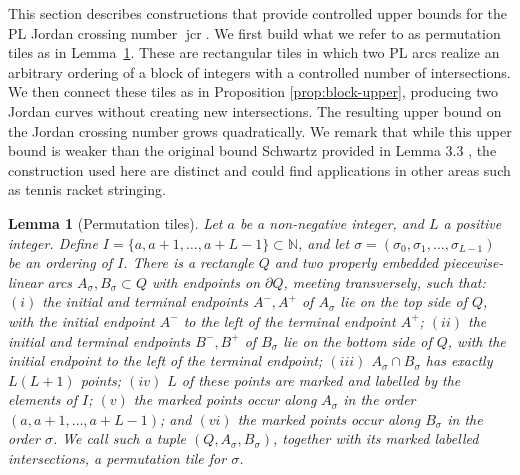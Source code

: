 \documentclass[11pt,a4paper]{amsart}
\newtheorem{lemma}[theorem]{Lemma}
\theoremstyle{definition}
\theoremstyle{remark}
\DeclareMathOperator{\jcr}{jcr}
\begin{document}
This section describes constructions that provide controlled upper bounds for the PL Jordan crossing number $\jcr$.  We first build what we refer to as permutation tiles as in Lemma~\ref{lem:tile}.  These are rectangular tiles in which two PL arcs realize an arbitrary ordering of a block of integers with a controlled number of intersections.  We then connect these tiles as in Proposition \ref{prop:block-upper}, producing two Jordan curves without creating new intersections. The resulting upper bound on the Jordan crossing number grows quadratically.  We remark that while this upper bound is weaker than the original bound Schwartz provided in Lemma 3.3 \cite{richtpss}, the construction used here are distinct and could find applications in other areas such as tennis racket stringing. 
\begin{lemma}[Permutation tiles]\label{lem:tile}
Let $a$ be a non-negative integer, and $L$ a positive integer.  Define $I=\{a,a+1,\ldots,a+L-1\}\subset\mathbb N$, and let $\sigma=(\sigma_{0},\sigma_{1},\ldots,\sigma_{L-1})$ be an ordering of $I$.  There is a rectangle $Q$ and two properly
embedded piecewise-linear arcs $A_\sigma,B_\sigma\subset Q$
with endpoints on $\partial Q$, meeting transversely, such that: $(i)$ the initial and terminal endpoints $A^-,A^+$ of $A_\sigma$ lie on the top side of
$Q$, with the initial endpoint $A^-$ to the left of the terminal endpoint $A^+$;
$(ii)$ the initial and terminal endpoints $B^-,B^+$ of $B_\sigma$ lie on the bottom side of
$Q$, with the initial endpoint to the left of the terminal endpoint;
$(iii)$ $A_\sigma\cap B_\sigma$ has exactly $L(L+1)$ points;
$(iv)$ $L$ of these points are marked and labelled by the elements of $I$;
$(v)$ the marked points occur along $A_\sigma$ in the order
$(a,a+1,\ldots,a+L-1)$; and
$(vi)$ the marked points occur along $B_\sigma$ in the order $\sigma$. We
call such a tuple $(Q,A_\sigma,B_\sigma)$, together with its marked labelled
intersections, a \emph{permutation tile} for $\sigma$.
\end{lemma}
\end{document}
